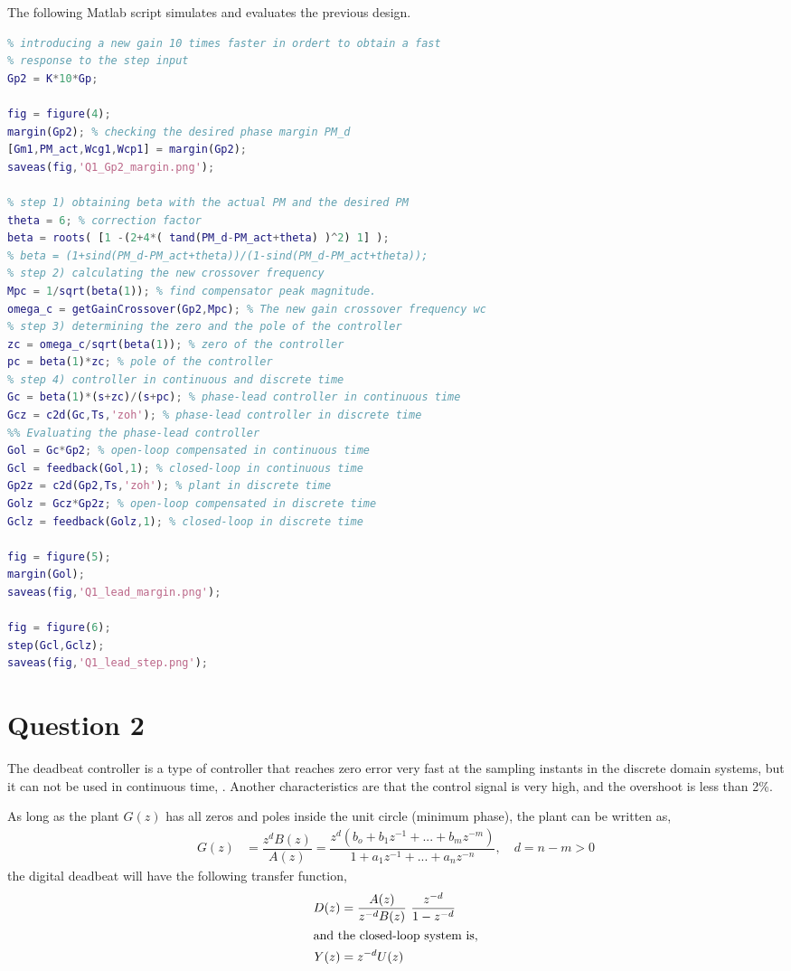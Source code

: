 \documentclass[11pt, a4paper]{article}
\begin{document}
The following Matlab script simulates and evaluates the previous design.
\begin{lstlisting}[language=matlab, caption={}, label={}]
%% Designing the Phase-lead digital controller 
% introducing a new gain 10 times faster in ordert to obtain a fast
% response to the step input
Gp2 = K*10*Gp;

fig = figure(4);
margin(Gp2); % checking the desired phase margin PM_d 
[Gm1,PM_act,Wcg1,Wcp1] = margin(Gp2);
saveas(fig,'Q1_Gp2_margin.png');

% step 1) obtaining beta with the actual PM and the desired PM
theta = 6; % correction factor
beta = roots( [1 -(2+4*( tand(PM_d-PM_act+theta) )^2) 1] );
% beta = (1+sind(PM_d-PM_act+theta))/(1-sind(PM_d-PM_act+theta));
% step 2) calculating the new crossover frequency
Mpc = 1/sqrt(beta(1)); % find compensator peak magnitude.
omega_c = getGainCrossover(Gp2,Mpc); % The new gain crossover frequency wc
% step 3) determining the zero and the pole of the controller
zc = omega_c/sqrt(beta(1)); % zero of the controller
pc = beta(1)*zc; % pole of the controller
% step 4) controller in continuous and discrete time
Gc = beta(1)*(s+zc)/(s+pc); % phase-lead controller in continuous time
Gcz = c2d(Gc,Ts,'zoh'); % phase-lead controller in discrete time
%% Evaluating the phase-lead controller
Gol = Gc*Gp2; % open-loop compensated in continuous time
Gcl = feedback(Gol,1); % closed-loop in continuous time
Gp2z = c2d(Gp2,Ts,'zoh'); % plant in discrete time
Golz = Gcz*Gp2z; % open-loop compensated in discrete time
Gclz = feedback(Golz,1); % closed-loop in discrete time

fig = figure(5);
margin(Gol);
saveas(fig,'Q1_lead_margin.png');

fig = figure(6);
step(Gcl,Gclz);
saveas(fig,'Q1_lead_step.png');
\end{lstlisting}

\section{Question 2}
The deadbeat controller is a type of controller that reaches zero error very fast at the sampling instants in the discrete domain systems, but it can not be used in continuous time, \cite{Westphal2012}. Another characteristics are that the control signal is very high, and the overshoot is less than 2\%.

As long as the plant $G(z)$ has all zeros and poles inside the unit circle (minimum phase), the plant can be written as,
\begin{align}
G(z) &= \dfrac{z^{d} B(z)}{A(z)} = \dfrac{z^{d}(b_o + b_1 z^{-1}+...+b_m z^{-m})}{1+a_1 z^{-1} + ... + a_n z^{-n}}, \quad d=n-m>0
\end{align}
the digital deadbeat will have the following transfer function,
\begin{align}
D(z) &= \dfrac{A(z)}{z^{-d}B(z)}~\dfrac{z^{-d}}{1-z^{-d}}\\
\intertext{and the closed-loop system is,}
Y(z) &= z^{-d} U(z)
\end{align}
\end{document}
